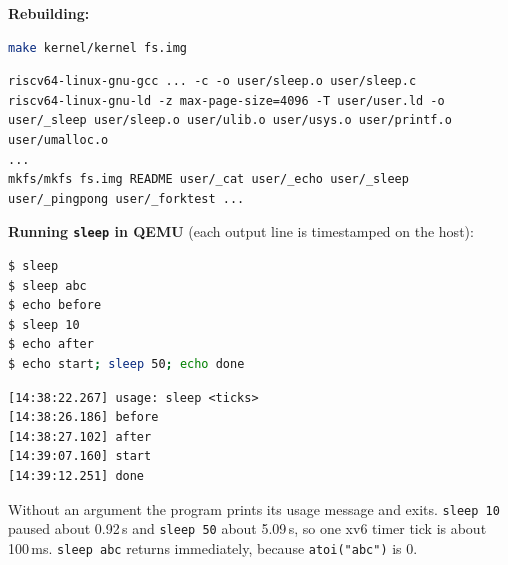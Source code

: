 \documentclass[12pt]{article}
\begin{document}
\textbf{Rebuilding:}
\begin{lstlisting}[language=bash]
make kernel/kernel fs.img
\end{lstlisting}
\begin{lstlisting}
riscv64-linux-gnu-gcc ... -c -o user/sleep.o user/sleep.c
riscv64-linux-gnu-ld -z max-page-size=4096 -T user/user.ld -o user/_sleep user/sleep.o user/ulib.o user/usys.o user/printf.o user/umalloc.o
...
mkfs/mkfs fs.img README user/_cat user/_echo user/_sleep user/_pingpong user/_forktest ...
\end{lstlisting}

\textbf{Running \texttt{sleep} in QEMU} (each output line is timestamped on the host):
\begin{lstlisting}[language=bash]
$ sleep
$ sleep abc
$ echo before
$ sleep 10
$ echo after
$ echo start; sleep 50; echo done
\end{lstlisting}
\begin{lstlisting}
[14:38:22.267] usage: sleep <ticks>
[14:38:26.186] before
[14:38:27.102] after
[14:39:07.160] start
[14:39:12.251] done
\end{lstlisting}
Without an argument the program prints its usage message and exits. \texttt{sleep 10} paused about 0.92\,s and \texttt{sleep 50} about 5.09\,s, so one xv6 timer tick is about 100\,ms. \texttt{sleep abc} returns immediately, because \texttt{atoi("abc")} is 0.
\end{document}
